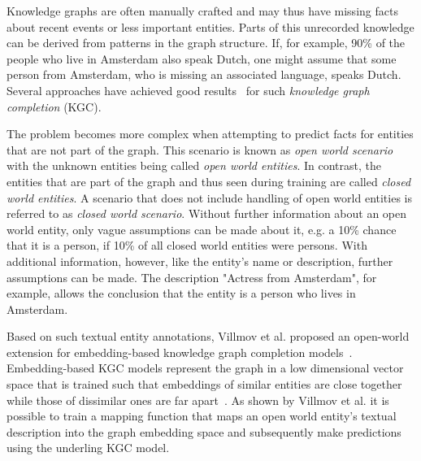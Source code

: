 Knowledge graphs are often manually crafted and may thus have missing facts about recent events or less important entities. Parts of this unrecorded knowledge can be derived from patterns in the graph structure. If, for example, 90\% of the people who live in Amsterdam also speak Dutch, one might assume that some person from Amsterdam, who is missing an associated language, speaks Dutch. Several approaches have achieved good results~\cite{Wang2017KnowledgeGE} for such \emph{knowledge graph completion} (KGC).

The problem becomes more complex when attempting to predict facts for entities that are not part of the graph. This scenario is known as \emph{open world scenario} with the unknown entities being called \emph{open world entities}. In contrast, the entities that are part of the graph and thus seen during training are called \emph{closed world entities}. A scenario that does not include handling of open world entities is referred to as \emph{closed world scenario}. Without further information about an open world entity, only vague assumptions can be made about it, e.g. a 10\% chance that it is a person, if 10\% of all closed world entities were persons. With additional information, however, like the entity's name or description, further assumptions can be made. The description "Actress from Amsterdam", for example, allows the conclusion that the entity is a person who lives in Amsterdam.


Based on such textual entity annotations, Villmov et al. proposed an open-world extension for embedding-based knowledge graph completion models~\cite{Shah2019AnOE}. Embedding-based KGC models represent the graph in a low dimensional vector space that is trained such that embeddings of similar entities are close together while those of dissimilar ones are far apart~\cite{Wang2017KnowledgeGE}. As shown by Villmov et al. it is possible to train a mapping function that maps an open world entity's textual description into the graph embedding space and subsequently make predictions using the underling KGC model.


